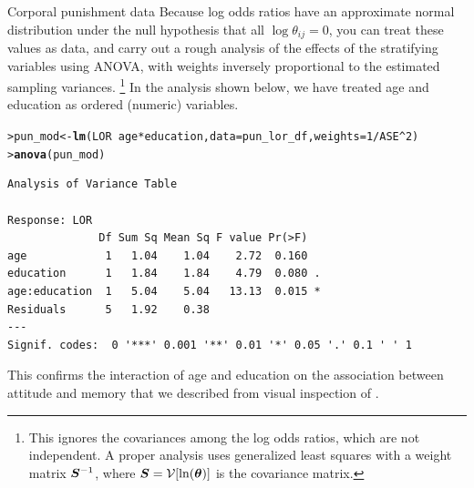 \documentclass[10pt,krantz2]{krantz}\usepackage[]{graphicx}\usepackage[]{color}
\makeatletter
\newcommand{\hlnum}[1]{\textcolor[rgb]{0.686,0.059,0.569}{#1}}%
\newcommand{\hlopt}[1]{\textcolor[rgb]{0,0,0}{#1}}%
\newcommand{\hlstd}[1]{\textcolor[rgb]{0.345,0.345,0.345}{#1}}%
\newcommand{\hlkwb}[1]{\textcolor[rgb]{0.69,0.353,0.396}{#1}}%
\newcommand{\hlkwc}[1]{\textcolor[rgb]{0.333,0.667,0.333}{#1}}%
\newcommand{\hlkwd}[1]{\textcolor[rgb]{0.737,0.353,0.396}{\textbf{#1}}}%
\newenvironment{kframe}{%
 \def\at@end@of@kframe{}%
 \ifinner\ifhmode%
  \def\at@end@of@kframe{\end{minipage}}%
  \begin{minipage}{\columnwidth}%
 \fi\fi%
 \def\FrameCommand##1{\hskip\@totalleftmargin \hskip-\fboxsep
 \colorbox{shadecolor}{##1}\hskip-\fboxsep
     \hskip-\linewidth \hskip-\@totalleftmargin \hskip\columnwidth}%
 \MakeFramed {\advance\hsize-\width
   \@totalleftmargin\z@ \linewidth\hsize
   \@setminipage}}%
 {\par\unskip\endMakeFramed%
 \at@end@of@kframe}
\newenvironment{knitrout}{}{} %
\renewenvironment{knitrout}{\small\renewcommand{\baselinestretch}{.85}}{} %
\makeatother
\begin{document}
\begin{Example}[punish2]{Corporal punishment data}
Because log odds ratios have an approximate normal distribution under the null hypothesis that
all $\log \theta_{ij} =0$, you can treat these values as data, and carry out a rough analysis
of the effects of the stratifying variables using ANOVA, with weights inversely proportional to the
estimated sampling variances.%
\footnote{
This ignores the covariances among the log odds ratios, which are not independent.
A proper analysis uses generalized least squares
with a weight matrix $\bm{S}^{-1}$, where $\bm{S} = \mathcal{V} [\ln (\bm{\theta})]$ is the covariance matrix. 
}
In the analysis shown below, we have treated age and education as
ordered (numeric) variables.


\begin{knitrout}
\color{fgcolor}\begin{kframe}
\begin{alltt}
\hlstd{> }\hlstd{pun_mod} \hlkwb{<-} \hlkwd{lm}\hlstd{(LOR} \hlopt{~} \hlstd{age} \hlopt{*} \hlstd{education,} \hlkwc{data} \hlstd{= pun_lor_df,} \hlkwc{weights} \hlstd{=} \hlnum{1} \hlopt{/} \hlstd{ASE}\hlopt{^}\hlnum{2}\hlstd{)}
\hlstd{> }\hlkwd{anova}\hlstd{(pun_mod)}
\end{alltt}
\begin{verbatim}
Analysis of Variance Table

Response: LOR
              Df Sum Sq Mean Sq F value Pr(>F)  
age            1   1.04    1.04    2.72  0.160  
education      1   1.84    1.84    4.79  0.080 .
age:education  1   5.04    5.04   13.13  0.015 *
Residuals      5   1.92    0.38                 
---
Signif. codes:  0 '***' 0.001 '**' 0.01 '*' 0.05 '.' 0.1 ' ' 1
\end{verbatim}
\end{kframe}
\end{knitrout}
This confirms the interaction of age and education on the association between attitude and
memory that we described from visual inspection of .
\end{Example}
\end{document}
